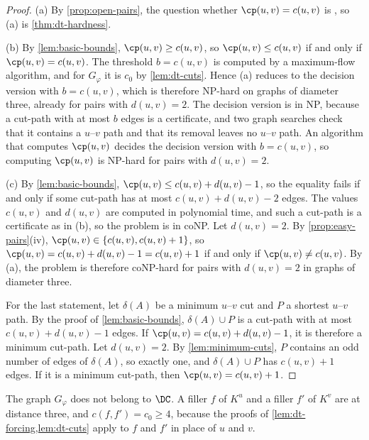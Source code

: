 \begin{proof}
(a) By \cref{prop:open-pairs}, the question whether $\cp(u, v) = c(u, v)$ is \PathInMinCut{}, so (a) is \cref{thm:dt-hardness}.

(b) By \cref{lem:basic-bounds}, $\cp(u, v) \geq c(u, v)$, so $\cp(u, v) \leq c(u, v)$ if and only if $\cp(u, v) = c(u, v)$.
The threshold $b = c(u, v)$ is computed by a maximum-flow algorithm, and for $G_\varphi$ it is $c_0$ by \cref{lem:dt-cuts}.
Hence (a) reduces to the decision version with $b = c(u, v)$, which is therefore NP-hard on graphs of diameter three, already for pairs with $d(u, v) = 2$.
The decision version is in NP, because a cut-path with at most $b$ edges is a certificate, and two graph searches check that it contains a $u$--$v$ path and that its removal leaves no $u$--$v$ path.
An algorithm that computes $\cp(u, v)$ decides the decision version with $b = c(u, v)$, so computing $\cp(u, v)$ is NP-hard for pairs with $d(u, v) = 2$.

(c) By \cref{lem:basic-bounds}, $\cp(u, v) \leq c(u, v) + d(u, v) - 1$, so the equality fails if and only if some cut-path has at most $c(u, v) + d(u, v) - 2$ edges.
The values $c(u, v)$ and $d(u, v)$ are computed in polynomial time, and such a cut-path is a certificate as in (b), so the problem is in coNP.
Let $d(u, v) = 2$.
By \cref{prop:easy-pairs}(iv), $\cp(u, v) \in \{c(u, v), c(u, v) + 1\}$, so $\cp(u, v) = c(u, v) + d(u, v) - 1 = c(u, v) + 1$ if and only if $\cp(u, v) \neq c(u, v)$.
By (a), the problem is therefore coNP-hard for pairs with $d(u, v) = 2$ in graphs of diameter three.

For the last statement, let $\delta(A)$ be a minimum $u$--$v$ cut and $P$ a shortest $u$--$v$ path.
By the proof of \cref{lem:basic-bounds}, $\delta(A) \cup P$ is a cut-path with at most $c(u, v) + d(u, v) - 1$ edges.
If $\cp(u, v) = c(u, v) + d(u, v) - 1$, it is therefore a minimum cut-path.
Let $d(u, v) = 2$.
By \cref{lem:minimum-cuts}, $P$ contains an odd number of edges of $\delta(A)$, so exactly one, and $\delta(A) \cup P$ has $c(u, v) + 1$ edges.
If it is a minimum cut-path, then $\cp(u, v) = c(u, v) + 1$.
\end{proof}

\begin{remark}
\label{rem:dt-not-in-dc}
The graph $G_\varphi$ does not belong to $\DC$.
A filler $f$ of $K^u$ and a filler $f'$ of $K^v$ are at distance three, and $c(f, f') = c_0 \geq 4$, because the proofs of \cref{lem:dt-forcing,lem:dt-cuts} apply to $f$ and $f'$ in place of $u$ and $v$.
\end{remark}

